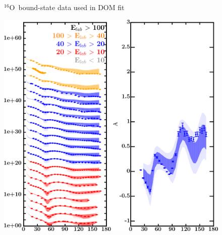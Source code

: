 \documentclass[twocolumn,secnumarabic,amssymb, nobibnotes, aps, prl,
superscriptaddress, nobalancelastpage]{revtex4}
\newcommand{\oSix}{\ensuremath{^{16}}O}
\begin{document}
\begin{figure}[!htb]
\begin{minipage}{0.4\linewidth}
        \label{DOM_o16_BE}
    \end{minipage}
    \caption{\oSix\ bound-state data used in DOM fit}
    \label{DOM_o16_structural}
\end{figure}

\begin{figure}[!htb]
    \centering
    \begin{minipage}{0.4\linewidth}
        \centering
        \includegraphics[width=\linewidth]{figures/o18_protonElastic.png}
        \label{DOM_o18_proton_elastic}
    \end{minipage}
    \begin{minipage}{0.4\linewidth}
        \centering
        \begin{minipage}[c]{0.5\linewidth}
            \centering

\end{minipage}
\end{minipage}
\end{figure}
\end{document}
